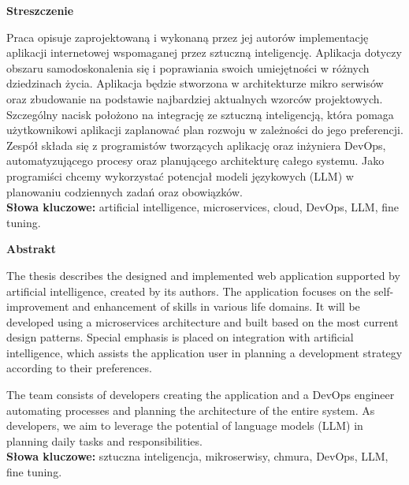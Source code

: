 \begin{center}
    {\bf\Large{Streszczenie}}\\
\end{center}
Praca opisuje zaprojektowaną i wykonaną przez jej autorów implementację
aplikacji internetowej wspomaganej przez sztuczną inteligencję. Aplikacja dotyczy obszaru samodoskonalenia się i poprawiania swoich umiejętności w różnych dziedzinach życia. Aplikacja będzie stworzona w architekturze mikro serwisów oraz zbudowanie na podstawie najbardziej aktualnych wzorców projektowych.
Szczególny nacisk położono na integrację ze sztuczną inteligencją, która pomaga użytkownikowi aplikacji zaplanować plan rozwoju w zależności do jego preferencji.
Zespół składa się z programistów tworzących aplikację oraz inżyniera DevOps, automatyzującego procesy oraz planującego architekturę całego systemu. Jako programiści chcemy wykorzystać potencjał modeli językowych (LLM) w planowaniu codziennych zadań oraz obowiązków.
\\
{\bf Słowa kluczowe:} artificial intelligence, microservices, cloud, DevOps, LLM, fine tuning.
\clearpage

\begin{center}
    {\bf\Large{Abstrakt}}\\
\end{center}
The thesis describes the designed and implemented web application supported by artificial intelligence, created by its authors. The application focuses on the self-improvement and enhancement of skills in various life domains. It will be developed using a microservices architecture and built based on the most current design patterns. Special emphasis is placed on integration with artificial intelligence, which assists the application user in planning a development strategy according to their preferences.

The team consists of developers creating the application and a DevOps engineer automating processes and planning the architecture of the entire system. As developers, we aim to leverage the potential of language models (LLM) in planning daily tasks and responsibilities.
\\
{\bf Słowa kluczowe:} sztuczna inteligencja, mikroserwisy, chmura, DevOps, LLM, fine tuning.